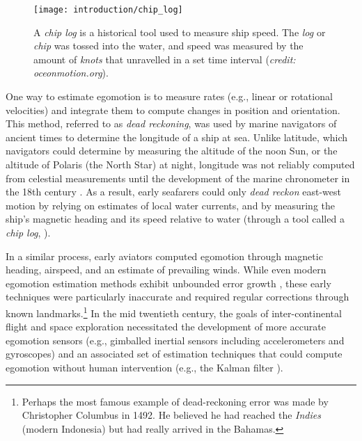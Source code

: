  \begin{wrapfigure}{r}{0.48\textwidth}
	\centering
	\texttt{[image: introduction/chip\_log]}
	\caption{A \textit{chip log} is a historical tool used to measure ship speed. The \textit{log} or \textit{chip} was tossed into the water, and speed was measured by the amount of \textit{knots} that unravelled in a set time interval (\textit{credit: oceonmotion.org}).}
	\label{fig:intro_chip_log}
	\vspace{-1em}
\end{wrapfigure}

 One way to estimate egomotion is to measure rates (e.g., linear or rotational velocities) and integrate them to compute changes in position and orientation. This method, referred to as \textit{dead reckoning}, was used by marine navigators of ancient times to determine the longitude of a ship at sea. Unlike latitude, which navigators could determine by measuring the altitude of the noon Sun, or the altitude of Polaris (the North Star) at night, longitude was not reliably computed from celestial measurements until the development of the marine chronometer in the 18th century \citep{Barfoot2017-ri}. As a result, early seafarers could only \textit{dead reckon} east-west motion by relying on estimates of local water currents, and by measuring the ship's magnetic heading and its speed relative to water (through a tool called a \textit{chip log}, ). 

In a similar process, early aviators computed egomotion through magnetic heading, airspeed, and an estimate of prevailing winds. While even modern egomotion estimation methods exhibit unbounded error growth \citep{Olson2003-ax}, these early techniques were particularly inaccurate and required regular corrections through known landmarks.\footnote{Perhaps the most famous example of dead-reckoning error was made by Christopher Columbus in 1492. He believed he had reached the \textit{Indies} (modern Indonesia) but had really arrived in the Bahamas.} In the mid twentieth century, the goals of inter-continental flight and space exploration necessitated the development of more accurate egomotion sensors (e.g., gimballed inertial sensors including accelerometers and gyroscopes) and an associated set of estimation techniques that could compute egomotion without human intervention (e.g., the Kalman filter \citep{Grewal2010-ts}).

